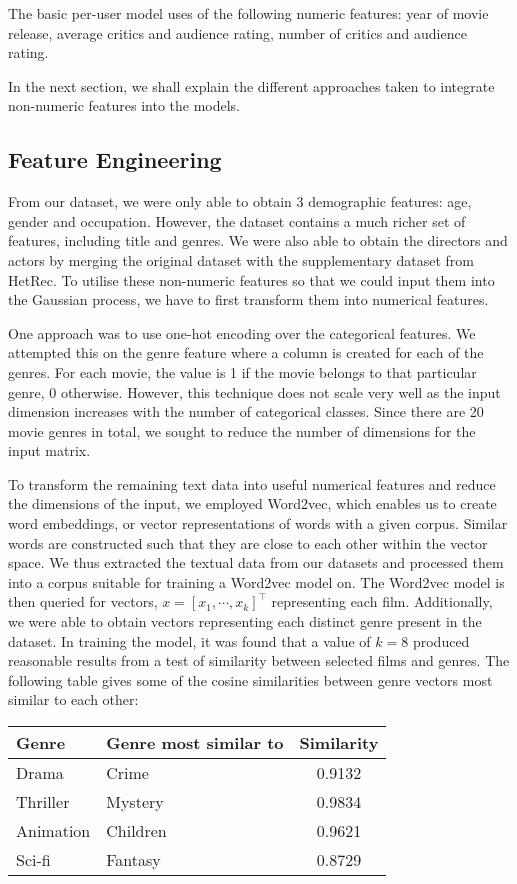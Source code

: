 \documentclass[letterpaper]{article}
\begin{document}
The basic per-user model uses of the following numeric features: year of movie release, average critics and audience rating, number of critics and audience rating.

In the next section, we shall explain the different approaches taken to integrate non-numeric features into the models.

\subsection{Feature Engineering}
From our dataset, we were only able to obtain 3 demographic features: age, gender and occupation. However, the dataset contains a much richer set of features, including title and genres. We were also able to obtain the directors and actors by merging the original dataset with the supplementary dataset from HetRec. To utilise these non-numeric features so that we could input them into the Gaussian process, we have to first transform them into numerical features.

One approach was to use one-hot encoding over the categorical features.
We attempted this on the genre feature where a column is created for each of the genres.
For each movie, the value is 1 if the movie belongs to that particular genre, 0 otherwise.
However, this technique does not scale very well as the input dimension increases with the number of categorical classes.
Since there are 20 movie genres in total, we sought to reduce the number of dimensions for the input matrix.

To transform the remaining text data into useful numerical features and reduce the dimensions of the input, we employed Word2vec, which enables us to create word embeddings, or vector representations of words with a given corpus.
Similar words are constructed such that they are close to each other within the vector space.
We thus extracted the textual data from our datasets and processed them into a corpus suitable for training a Word2vec model on.
The Word2vec model is then queried for vectors, $x = [x_1, \cdots, x_k]^\top$ representing each film.
Additionally, we were able to obtain vectors representing each distinct genre present in the dataset.
In training the model, it was found that a value of $k=8$ produced reasonable results from a test of similarity between selected films and genres.
The following table gives some of the cosine similarities between genre vectors most similar to each other:

\begin{center}
	\begin{tabular}{llc}
		Genre & Genre most similar to & Similarity\\
		\hline
		Drama & Crime & 0.9132 \\
		Thriller & Mystery & 0.9834 \\
		Animation & Children & 0.9621 \\
		Sci-fi & Fantasy & 0.8729 \\
	\end{tabular}
\end{center}
\end{document}
